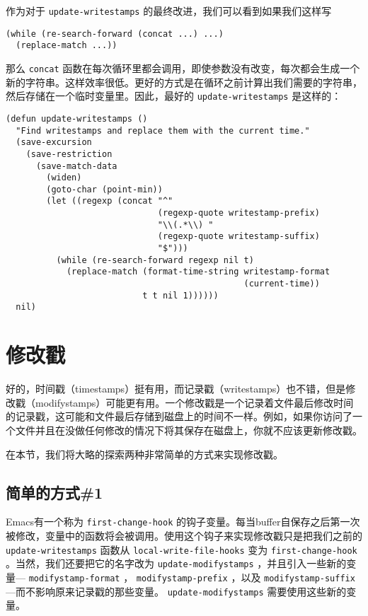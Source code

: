 作为对于 \texttt{update-writestamps} 的最终改进，我们可以看到如果我们这样写

\begin{verbatim}
(while (re-search-forward (concat ...) ...)
  (replace-match ...))
\end{verbatim}

那么 \texttt{concat} 函数在每次循环里都会调用，即使参数没有改变，每次都会生成一个新的字符串。这样效率很低。更好的方式是在循环之前计算出我们需要的字符串，然后存储在一个临时变量里。因此，最好的 \texttt{update-writestamps} 是这样的：

\begin{verbatim}
(defun update-writestamps ()
  "Find writestamps and replace them with the current time."
  (save-excursion
    (save-restriction
      (save-match-data
        (widen)
        (goto-char (point-min))
        (let ((regexp (concat "^"
                              (regexp-quote writestamp-prefix)
                              "\\(.*\\) "
                              (regexp-quote writestamp-suffix)
                              "$")))
          (while (re-search-forward regexp nil t)
            (replace-match (format-time-string writestamp-format
                                               (current-time))
                           t t nil 1))))))
  nil)
\end{verbatim}

\section{修改戳}
\label{section:04-Modifystamps}

好的，时间戳（timestamps）挺有用，而记录戳（writestamps）也不错，但是修改戳（modifystamps）可能更有用。一个修改戳是一个记录着文件最后修改时间的记录戳，这可能和文件最后存储到磁盘上的时间不一样。例如，如果你访问了一个文件并且在没做任何修改的情况下将其保存在磁盘上，你就不应该更新修改戳。

在本节，我们将大略的探索两种非常简单的方式来实现修改戳。

\subsection{简单的方式\#{}1}
\label{section:04-Simple-Approach-1}

Emacs有一个称为 \texttt{first-change-hook} 的钩子变量。每当buffer自保存之后第一次被修改，变量中的函数将会被调用。使用这个钩子来实现修改戳只是把我们之前的 \texttt{update-writestamps} 函数从 \texttt{local-write-file-hooks} 变为 \texttt{first-change-hook} 。当然，我们还要把它的名字改为 \texttt{update-modifystamps} ，并且引入一些新的变量--- \texttt{modifystamp-format} ， \texttt{modifystamp-prefix} ，以及 \texttt{modifystamp-suffix} ---而不影响原来记录戳的那些变量。 \texttt{update-modifystamps} 需要使用这些新的变量。

